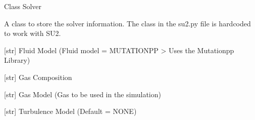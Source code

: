 \documentclass[letterpaper,10pt,english]{sphinxmanual}
\begin{document}
\begin{fulllineitems}
\label{\detokenize{modules:su2.Solver}}
\pysigstartsignatures
{}
\pysigstopsignatures
\sphinxAtStartPar
Class Solver

\sphinxAtStartPar
A class to store the solver information.
The class in the su2.py file is hardcoded to work with SU2.

\begin{fulllineitems}
\label{\detokenize{modules:su2.Solver.fluid_model}}
\pysigstartsignatures
{}
\pysigstopsignatures
\sphinxAtStartPar
{[}str{]} Fluid Model (Fluid model = MUTATIONPP \sphinxhyphen{}\textgreater{} Uses the Mutationpp Library)

\end{fulllineitems}


\begin{fulllineitems}
\label{\detokenize{modules:su2.Solver.gas_composition}}
\pysigstartsignatures
{}
\pysigstopsignatures
\sphinxAtStartPar
{[}str{]} Gas Composition

\end{fulllineitems}


\begin{fulllineitems}
\label{\detokenize{modules:su2.Solver.gas_model}}
\pysigstartsignatures
{}
\pysigstopsignatures
\sphinxAtStartPar
{[}str{]} Gas Model (Gas to be used in the simulation)

\end{fulllineitems}


\begin{fulllineitems}
\label{\detokenize{modules:su2.Solver.kind_turb_model}}
\pysigstartsignatures
{}
\pysigstopsignatures
\sphinxAtStartPar
{[}str{]} Turbulence Model (Default = NONE)


\end{fulllineitems}
\end{fulllineitems}
\end{document}
